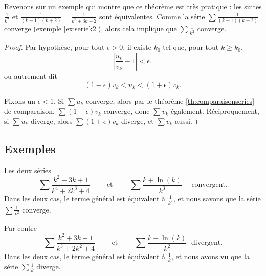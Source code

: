 \documentclass[class=report,crop=false]{standalone}
\begin{document}
Revenons sur un exemple qui montre que ce théorème est très pratique :
les suites $\frac{1}{k^2}$ et $\frac{1}{(k+1)(k+2)}=\frac{1}{k^2+3k+2}$
sont équivalentes. Comme la série $\sum \frac{1}{(k+1)(k+2)}$ converge 
(exemple \ref{ex:seriek2}), alors
cela implique que $\sum \frac{1}{k^2}$ converge.

\begin{proof}
Par hypothèse, pour tout $\epsilon>0$, il existe $k_0$ tel que, pour
tout $k \ge k_0$,
$$\left|\frac{u_k}{v_k} -1\right| < \epsilon,$$
ou autrement dit 
$$(1-\epsilon)v_k < u_k <(1+\epsilon) v_k.$$

Fixons un $\epsilon <1$.
Si $\sum u_k$ converge, alors par le théorème \ref{th:comparaisonseries} de comparaison, 
$\sum(1-\epsilon) v_k$ converge, donc $\sum v_k$ également. 
Réciproquement, si $\sum u_k$ diverge, alors
$\sum (1+\epsilon)v_k$ diverge, et $\sum v_k$ aussi.
\end{proof}


\subsection{Exemples}

\begin{exemple}
Les deux séries 
$$
\sum \frac{k^2+3k+1}{k^4+2k^3+4}
\qquad \text{ et } \qquad 
\sum \frac{k +\ln(k)}{k^3}
\quad \text{ convergent.}
$$
Dans les deux cas, le terme général est équivalent à $\frac{1}{k^2}$, 
et nous savons que la série $\sum \frac{1}{k^2}$ converge.  
\end{exemple}

\begin{exemple}
Par contre
$$
\sum \frac{k^2+3k+1}{k^3+2k^2+4}
\qquad \text{ et } \qquad 
\sum \frac{k +\ln(k)}{k^2}
\;\mbox{ divergent.}
$$
Dans les deux cas, le terme général est équivalent à
$\frac{1}{k}$, et nous avons vu que la série $\sum \frac{1}{k}$
diverge.  
\end{exemple}
\end{document}
